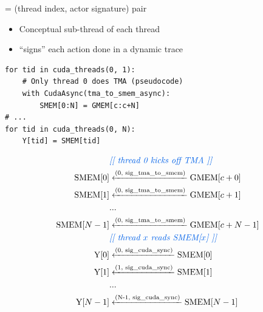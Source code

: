 \begin{minipage}[t]{0.48\textwidth}\fixminipage
{} = (thread index, actor signature) pair
\begin{itemize}
  \item Conceptual sub-thread of each thread
  \item ``signs'' each action done in a dynamic trace
\end{itemize}
\vspace{2mm}
\begin{verbatim}
for tid in cuda_threads(0, 1):
    # Only thread 0 does TMA (pseudocode)
    with CudaAsync(tma_to_smem_async):
        SMEM[0:N] = GMEM[c:c+N]
# ...
for tid in cuda_threads(0, N):
    Y[tid] = SMEM[tid]
\end{verbatim}
\vspace{-4mm}
\begin{align*}
    & {\color{blueBoxFg}\textit{[[ thread 0 kicks off TMA ]]}} \\
    \text{SMEM[$0$]} & \xleftarrow{\text{(0, sig\_tma\_to\_smem)}} \text{GMEM[$c+0$]} \\
    \text{SMEM[$1$]} & \xleftarrow{\text{(0, sig\_tma\_to\_smem)}} \text{GMEM[$c+1$]} \\
    & ... \\
    \text{SMEM[$N-1$]} & \xleftarrow{\text{(0, sig\_tma\_to\_smem)}} \text{GMEM[$c+N-1$]} \\
    & {\color{blueBoxFg}\textit{[[ thread $x$ reads SMEM[$x$] ]]}} \\
    \text{Y[$0$]} & \xleftarrow{\text{(0, sig\_cuda\_sync)}} \text{SMEM[$0$]} \\
    \text{Y[$1$]} & \xleftarrow{\text{(1, sig\_cuda\_sync)}} \text{SMEM[$1$]} \\
    & ... \\
    \text{Y[$N-1$]} & \xleftarrow{\text{(N-1, sig\_cuda\_sync)}} \text{SMEM[$N-1$]} \\
\end{align*}
\end{minipage}
\newpage
{}

